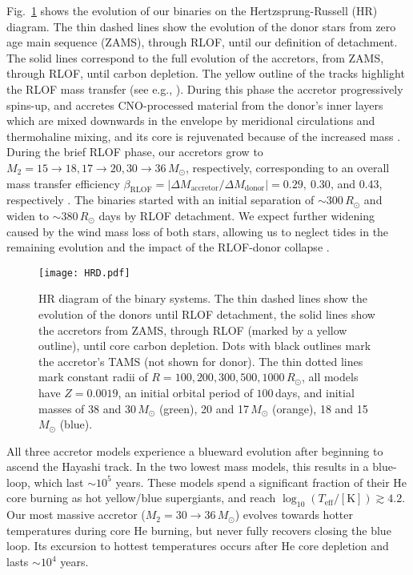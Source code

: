 \documentclass[twocolumn,twocolappendix,trackchanges]{aastex63}
\DeclareRobustCommand{\Figref}[1]{Fig.~\ref{#1}}
\begin{document}
\Figref{fig:HRD} shows the evolution of our binaries on the
Hertzsprung-Russell (HR) diagram. The thin dashed lines show the
evolution of the donor stars \citep[e.g.,][]{morton:60, gotberg:2018,
  laplace:2021} from zero age main sequence (ZAMS), through RLOF,
until our definition of detachment. The solid lines correspond to the
full evolution of the accretors, from ZAMS, through RLOF, until carbon
depletion. The yellow outline of the tracks highlight the RLOF mass
transfer (see e.g., \citealt{renzo:2021zoph}). During this phase the
accretor progressively spins-up, and accretes CNO-processed material
from the donor's inner layers which are mixed downwards in the
envelope by meridional circulations and thermohaline mixing, and its
core is rejuvenated because of the increased mass \citep[see
also][]{sravan:2019, renzo:2021zoph, wang:2020}. During the brief RLOF
phase, our accretors grow to
$M_2=15\rightarrow 18, 17\rightarrow 20, 30\rightarrow 36\,M_\odot$,
respectively, corresponding to an overall mass transfer efficiency
$\beta_\mathrm{RLOF}=|\Delta M_\mathrm{accretor}/\Delta M_\mathrm{donor}| = 0.29,\ 0.30,$\,and
0.43, respectively \citep[see discussion in ][]{renzo:2021zoph}.
The binaries started with an initial separation of
  $\sim{}300\,R_\odot$ and widen to $\sim{}380\,R_\odot$ days by RLOF
  detachment. We expect further widening caused by the wind mass loss
  of both stars, allowing us to neglect tides in the remaining
  evolution and the impact of the RLOF-donor collapse
  \citep{hirai:2018, ogata:2021}.
\begin{figure}[tbp]
  \texttt{[image: HRD.pdf]}
  \caption{HR diagram of the binary systems. The thin dashed lines
    show the evolution of the donors until RLOF detachment, the solid
    lines show the accretors from ZAMS, through RLOF (marked by a
    yellow outline), until core carbon depletion. Dots with black
    outlines mark the accretor's TAMS (not shown for donor). The thin
    dotted lines mark constant radii of
    $R=100, 200, 300, 500, 1000\,R_\odot$, all models have $Z=0.0019$,
    an initial orbital period of $100$\,days, and initial masses of 38
    and 30\,$M_\odot$ (green), 20 and 17\,$M_\odot$ (orange), 18 and
    15\,$M_\odot$ (blue).}
  \label{fig:HRD}
\end{figure}

All three accretor models experience a blueward evolution after
beginning to ascend the Hayashi track. In the two lowest mass models,
this results in a blue-loop, which last $\sim{}10^5$ years. These
models spend a significant fraction of their He core burning as hot
yellow/blue supergiants, and reach
$\log_{10}(T_\mathrm{eff}/\mathrm{[K]})\gtrsim 4.2$. Our most massive
accretor ($M_2=30\rightarrow 36\,M_\odot$) evolves towards hotter
temperatures during core He burning, but never fully recovers closing
the blue loop. Its excursion to hottest temperatures occurs after He
core depletion and lasts $\sim{}10^{4}$ years.
\end{document}
